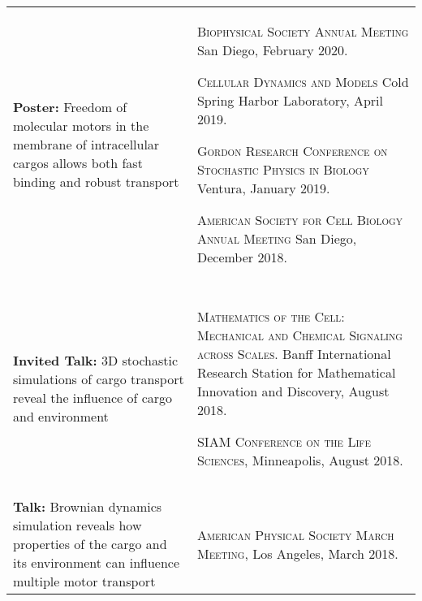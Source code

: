 \documentclass[letterpaper,10pt]{article} %
\makeatletter
\newcommand\cellwidth{\TX@col@width}
\makeatother
\begin{document}
\begin{tabularx}{\textwidth}{p{} | X}
\begin{minipage}{.4\textwidth}
\textbf{Poster:} Freedom of molecular motors in the membrane of intracellular cargos allows both fast binding and robust transport
\end{minipage}
&
\begin{minipage}{\cellwidth}
\begin{description}[itemsep=.25ex,labelsep=0em]
\item \textsc{Biophysical Society Annual Meeting} San Diego, February 2020.
\item \textsc{Cellular Dynamics and Models} Cold Spring Harbor Laboratory, April 2019.
\item \textsc{Gordon Research Conference on Stochastic Physics in Biology} Ventura, January 2019.
\item \textsc{American Society for Cell Biology Annual Meeting} San Diego, December 2018.
\end{description}
\end{minipage} \\

\multicolumn{2}{c}{} \\
\multicolumn{2}{c}{} \\

\begin{minipage}{.4\textwidth}
\textbf{Invited Talk:} 3D stochastic simulations of cargo transport reveal the influence of cargo and environment
\end{minipage}
&
\begin{minipage}{\cellwidth}
\begin{description}[itemsep=.25ex,labelsep=0em]
\item \textsc{Mathematics of the Cell: Mechanical and Chemical Signaling across Scales.} Banff International Research Station for Mathematical Innovation and Discovery, August 2018.
\item \textsc{SIAM Conference on the Life Sciences}, Minneapolis, August 2018.
\end{description}
\end{minipage} \\

\multicolumn{2}{c}{} \\
\multicolumn{2}{c}{} \\

\begin{minipage}{.4\textwidth}
\textbf{Talk:} Brownian dynamics simulation reveals how properties of the cargo and its environment can influence multiple motor transport
\end{minipage}
&
\begin{minipage}{\cellwidth}
\begin{description}[itemsep=.25ex,labelsep=0em]
\item \textsc{American Physical Society March Meeting}, Los Angeles, March 2018.
\end{description}
\end{minipage} \\


\end{tabularx}
\end{document}
